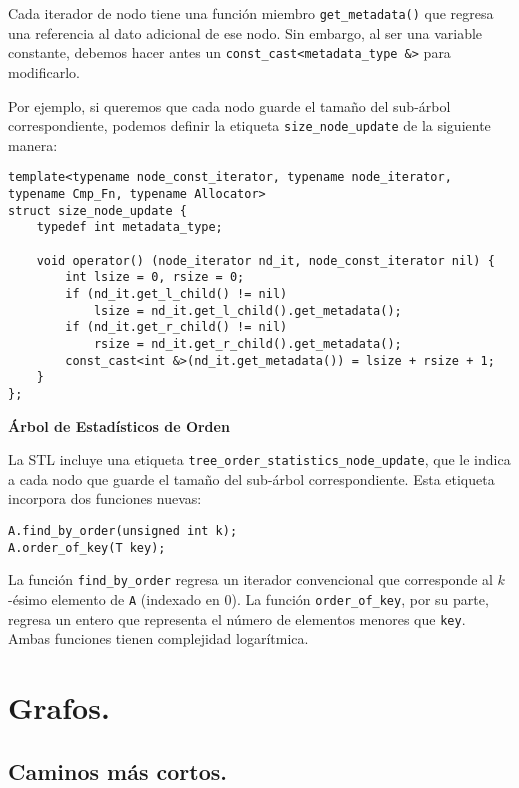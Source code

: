 \documentclass[10pt, letterpaper, twoside]{article}
\begin{document}
Cada iterador de nodo tiene una función miembro \texttt{get\_metadata()} que regresa una referencia al dato adicional de ese nodo. Sin embargo, al ser una variable constante, debemos hacer antes un \texttt{const\_cast<metadata\_type \&>} para modificarlo.

Por ejemplo, si queremos que cada nodo guarde el tamaño del sub-árbol correspondiente, podemos definir la etiqueta \texttt{size\_node\_update} de la siguiente manera:

\begin{lstlisting}
template<typename node_const_iterator, typename node_iterator, typename Cmp_Fn, typename Allocator>
struct size_node_update {
    typedef int metadata_type;

    void operator() (node_iterator nd_it, node_const_iterator nil) {
        int lsize = 0, rsize = 0;
        if (nd_it.get_l_child() != nil)
            lsize = nd_it.get_l_child().get_metadata();
        if (nd_it.get_r_child() != nil)
            rsize = nd_it.get_r_child().get_metadata();
        const_cast<int &>(nd_it.get_metadata()) = lsize + rsize + 1;
    }
};
\end{lstlisting}

\textbf{Árbol de Estadísticos de Orden}

La STL incluye una etiqueta \texttt{tree\_order\_statistics\_node\_update}, que le indica a cada nodo que guarde el tamaño del sub-árbol correspondiente. Esta etiqueta incorpora dos funciones nuevas:
\begin{lstlisting}
A.find_by_order(unsigned int k);
A.order_of_key(T key);
\end{lstlisting}
La función \texttt{find\_by\_order} regresa un iterador convencional que corresponde al $k$-ésimo elemento de \texttt{A} (indexado en 0). La función \texttt{order\_of\_key}, por su parte, regresa un entero que representa el número de elementos menores que \texttt{key}. Ambas funciones tienen complejidad logarítmica.

 \medskip

\newpage

\section{Grafos.}

\subsection{Caminos más cortos.}
\end{document}
